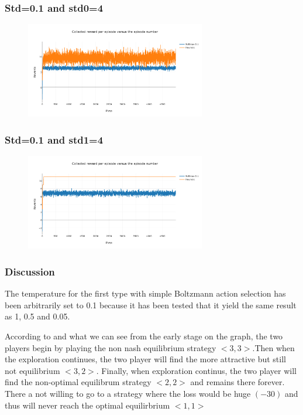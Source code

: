 \documentclass[11pt]{article}
\begin{document}
\subsubsection{Std=0.1 and std0=4}

\begin{figure}[H]
   \centering
   \includegraphics[width=0.7\textwidth]{img/2/2.png}
\end{figure}

\subsubsection{Std=0.1 and std1=4}

\begin{figure}[H]
   \centering
   \includegraphics[width=0.7\textwidth]{img/2/3.png}
\end{figure}

\subsubsection{Discussion}

The temperature for the first type with simple Boltzmann action selection has been arbitrarily set to 0.1 because it has been tested that it yield the same result as 1, 0.5 and 0.05.

According to \cite{bestref} and what we can see from the early stage on the graph, the two players begin by playing the non nash equilibrium strategy $<3,3>$.Then when the exploration continues, the two player will find the more attractive but still not equilibrium $<3,2>$. Finally, when exploration continus, the two player will find the non-optimal equilibrum strategy $<2,2>$ and remains there forever. There a not willing to go to a strategy where the loss would be huge $(-30)$ and thus will never reach the optimal equilirbrium $<1,1>$
\end{document}
